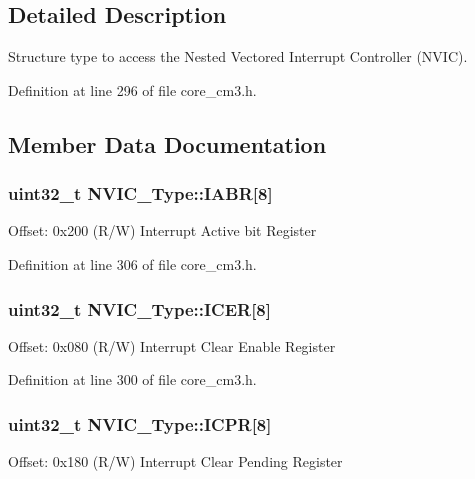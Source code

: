 \subsection{Detailed Description}
Structure type to access the Nested Vectored Interrupt Controller (N\+V\+IC). 

Definition at line 296 of file core\+\_\+cm3.\+h.



\subsection{Member Data Documentation}
\subsubsection[{\texorpdfstring{I\+A\+BR}{IABR}}]{ uint32\+\_\+t N\+V\+I\+C\+\_\+\+Type\+::\+I\+A\+BR\mbox{[}8\mbox{]}}\hypertarget{structNVIC__Type_a33e917b381e08dabe4aa5eb2881a7c11}{}\label{structNVIC__Type_a33e917b381e08dabe4aa5eb2881a7c11}
Offset\+: 0x200 (R/W) Interrupt Active bit Register 

Definition at line 306 of file core\+\_\+cm3.\+h.

\subsubsection[{\texorpdfstring{I\+C\+ER}{ICER}}]{ uint32\+\_\+t N\+V\+I\+C\+\_\+\+Type\+::\+I\+C\+ER\mbox{[}8\mbox{]}}\hypertarget{structNVIC__Type_a1965a2e68b61d2e2009621f6949211a5}{}\label{structNVIC__Type_a1965a2e68b61d2e2009621f6949211a5}
Offset\+: 0x080 (R/W) Interrupt Clear Enable Register 

Definition at line 300 of file core\+\_\+cm3.\+h.

\subsubsection[{\texorpdfstring{I\+C\+PR}{ICPR}}]{ uint32\+\_\+t N\+V\+I\+C\+\_\+\+Type\+::\+I\+C\+PR\mbox{[}8\mbox{]}}\hypertarget{structNVIC__Type_a46241be64208436d35c9a4f8552575c5}{}\label{structNVIC__Type_a46241be64208436d35c9a4f8552575c5}
Offset\+: 0x180 (R/W) Interrupt Clear Pending Register 

